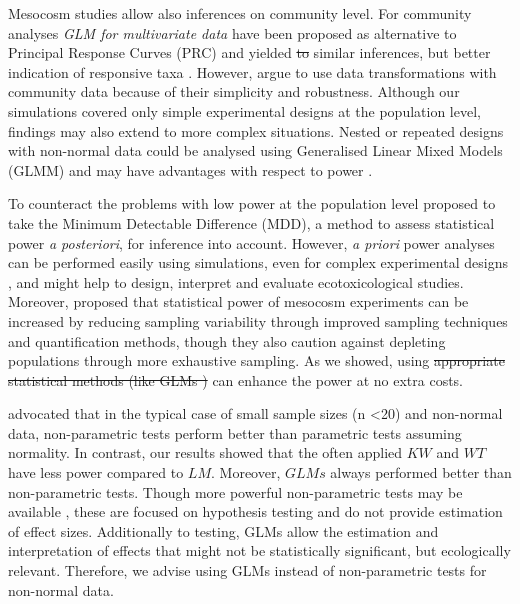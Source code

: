 \documentclass[twocolumn, natbib]{svjour3}
\providecommand{\DIFadd}[1]{{\protect\color{blue}\uwave{#1}}} %
\providecommand{\DIFdel}[1]{{\protect\color{red}\sout{#1}}}                      %
\providecommand{\DIFaddbegin}{} %
\providecommand{\DIFaddend}{} %
\providecommand{\DIFdelbegin}{} %
\providecommand{\DIFdelend}{} %
\begin{document}
Mesocosm studies allow also inferences on community level. 
For community analyses \emph{GLM for multivariate data} \citep{warton_distance-based_2012} have been proposed as alternative to Principal Response Curves (PRC) and yielded \DIFdelbegin \DIFdel{to }\DIFdelend similar inferences, but better indication of responsive taxa \citep{szocs_analysing_2015}. 
However, \citet{ter_braak_topics_2014} argue to use data transformations with community data because of their simplicity and robustness.
Although our simulations covered only simple experimental designs at the population level, findings may also extend to more complex situations. 
Nested or repeated designs with non-normal data could be analysed using Generalised Linear Mixed Models (GLMM) and may have advantages with respect to power \citep{stroup_rethinking_2014}.

To counteract the problems with low power at the population level \citet{brock_minimum_2015} proposed to take the Minimum Detectable Difference (MDD), a method to assess statistical power \emph{a posteriori}, for inference into account.
However, \emph{a priori} power analyses can be performed easily using simulations, even for complex experimental designs \DIFdelbegin %
\DIFdelend \DIFaddbegin \citep{johnson_power_2015}\DIFaddend , and might help to design, interpret and evaluate ecotoxicological studies.
Moreover, \citet{brock_minimum_2015} proposed that statistical power of mesocosm experiments can be increased by reducing sampling variability through improved sampling techniques and quantification methods, though they also caution against depleting populations through more exhaustive sampling.
As we showed, using \DIFdelbegin \DIFdel{appropriate statistical methods (like GLMs ) }\DIFdelend \DIFaddbegin \DIFadd{GLMs }\DIFaddend can enhance the power at no extra costs.

\citet{wang_making_2011} advocated that in the typical case of small sample sizes (n \textless 20) and non-normal data, non-parametric tests perform better than parametric tests assuming normality.
In contrast, our results showed that the often applied $KW$ and $WT$ have less power compared to $LM$.
Moreover, $GLMs$ always performed better than non-parametric tests. 
Though more powerful non-parametric tests may be available \citep{konietschke_rank-based_2012}, these are focused on hypothesis testing and do not provide estimation of effect sizes.
Additionally to testing, GLMs allow the estimation and interpretation of effects that might not be statistically significant, but ecologically relevant.
Therefore, we advise using GLMs instead of non-parametric tests for non-normal data.
\end{document}
